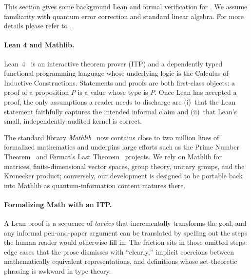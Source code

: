 This section gives some background Lean and formal verification for
. We assume familiarity with quantum error
correction and standard linear algebra.
For more details please refer to \cite{avigad2020mathematics}.

\paragraph{Lean 4 and Mathlib.} Lean~4~\cite{demoura2021} is an interactive
theorem prover (ITP) and a dependently typed functional programming language
whose underlying logic is the Calculus of Inductive Constructions. Statements
and proofs are both first-class objects: a proof of a proposition $P$ is a value
whose type is $P$. Once Lean has accepted a proof, the only assumptions a reader
needs to discharge are (i)~that the Lean statement faithfully captures the
intended informal claim and (ii)~that Lean's small, independently audited kernel
is correct.

The standard library \emph{Mathlib}~\cite{mathlib2020} now contains close to two
million lines of formalized mathematics and underpins large efforts such as the
Prime Number Theorem~\cite{Kontorovich_Prime_Number_Theorem_2024} and Fermat's
Last Theorem~\cite{FLT_Lean} projects. We rely on Mathlib for matrices,
finite-dimensional vector spaces, group theory, unitary groups, and the
Kronecker product; conversely, our development is designed to be portable back
into Mathlib as quantum-information content matures there.

\paragraph{Formalizing Math with an ITP.} A Lean proof is a sequence of \emph{tactics} that incrementally transforms the goal, and any informal pen-and-paper argument can be translated by spelling out the steps the human reader would otherwise fill in. The friction sits in those omitted steps: edge cases that the prose dismisses with ``clearly,'' implicit coercions between mathematically equivalent representations, and definitions whose set-theoretic phrasing is awkward in type theory.

